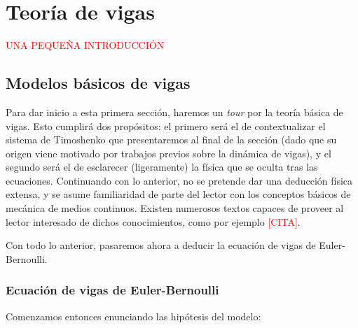 \chapter{Teoría de vigas}
\label{ch:teoriaVigas}

\textcolor{red}{UNA PEQUEÑA INTRODUCCIÓN}

\section{Modelos básicos de vigas}
\label{ch:teoriaVigas:section:primerosmodelos}

Para dar inicio a esta primera sección, haremos un \textit{tour} por la teoría básica de vigas. Esto cumplirá dos propósitos: el primero será el de contextualizar el sistema de Timoshenko que presentaremos al final de la sección (dado que su origen viene motivado por trabajos previos sobre la dinámica de vigas), y el segundo será el de esclarecer (ligeramente) la física que se oculta tras las ecuaciones. Continuando con lo anterior, no se pretende dar una deducción física extensa, y se asume familiaridad de parte del lector con los conceptos básicos de mecánica de medios continuos. Existen numerosos textos capaces de proveer al lector interesado de dichos conocimientos, como por ejemplo \textcolor{red}{[CITA]}.

Con todo lo anterior, pasaremos ahora a deducir la ecuación de vigas de Euler-Bernoulli.

\subsection{Ecuación de vigas de Euler-Bernoulli}
\label{ch:teoriaVigas:section:primerosmodelos:subsection:eulerbernoulli}

Comenzamos entonces enunciando las hipótesis del modelo:

